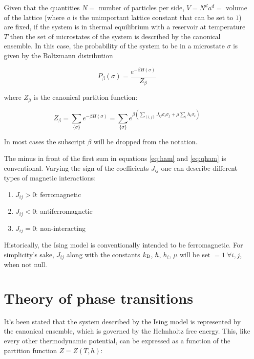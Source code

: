 \br

Given that the quantities $N = $ number of particles per side, $V = N^d a^d = $ volume of the lattice (where $a$ is the unimportant lattice constant that can be set to $1$) are fixed, if the system is in thermal equilibrium with a reservoir at temperature $T$ then the set of microstates of the system is described by the canonical ensemble. In this case, the probability of the system to be in a microstate $\sigma$ is given by the Boltzmann distribution

\begin{equation}
  P_{\beta}(\sigma) = \frac{e^{- \beta H(\sigma)}}{Z_{\beta}}
\end{equation}

where $Z_{\beta}$ is the canonical partition function:

\begin{equation}
  Z_{\beta} = \sum_{\{\sigma\}} e^{- \beta H(\sigma)} = \sum_{\{\sigma\}} e^{\beta \left( \sum_{\left< i, j \right>} J_{ij} \sigma_i \sigma_j + \mu \sum_{i} h_i \sigma_i \right)}
  \label{eq:partition_function}
\end{equation}

In most cases the subscript $\beta$ will be dropped from the notation.

\br

The minus in front of the first sum in equations \ref{eq:ham} and \ref{eq:qham} is conventional. Varying the sign of the coefficients $J_{ij}$ one can describe different types of magnetic interactions:

\begin{enumerate}
  \item $J_{ij} > 0$: ferromagnetic
  \item $J_{ij} < 0$: antiferromagnetic
  \item $J_{ij} = 0$: non-interacting
\end{enumerate}

Historically, the Ising model is conventionally intended to be ferromagnetic. For simplicity's sake, $J_{ij}$ along with the constants $k_{\mathrm{B}}$, $\hbar$, $h_i$, $\mu$ will be set $= 1 \; \forall i, j$, when not null.

\section{Theory of phase transitions}

It's been stated that the system described by the Ising model is represented by the canonical ensemble, which is governed by the Helmholtz free energy. This, like every other thermodynamic potential, can be expressed as a function of the partition function $Z = Z(T, h)$:

